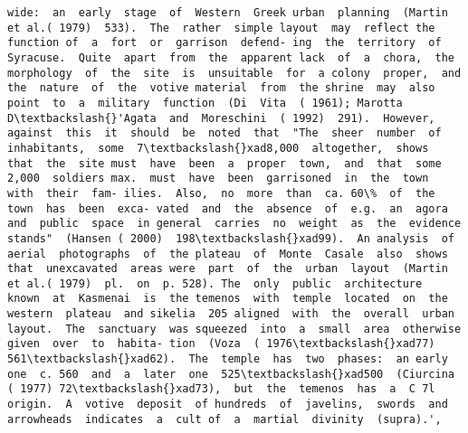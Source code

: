 \documentclass[11pt]{article}
\begin{document}
\begin{Verbatim}[commandchars=\\\{\}]
wide:  an  early  stage  of  Western  Greek urban  planning  (Martin  et al.( 1979)  533).  The  rather  simple layout  may  reflect the function of  a  fort  or  garrison  defend- ing  the  territory  of  Syracuse.  Quite  apart  from  the  apparent lack  of  a  chora,  the  morphology  of  the  site  is  unsuitable  for  a colony  proper,  and  the  nature  of  the  votive material  from  the shrine  may  also  point  to  a  military  function  (Di  Vita  ( 1961); Marotta  D\textbackslash{}'Agata  and  Moreschini  ( 1992)  291).  However, against  this  it  should  be  noted  that  "The  sheer  number  of inhabitants,  some  7\textbackslash{}xad8,000  altogether,  shows  that  the  site must  have  been  a  proper  town,  and  that  some  2,000  soldiers max.  must  have  been  garrisoned  in  the  town  with  their  fam- ilies.  Also,  no  more  than  ca. 60\%  of  the  town  has  been  exca- vated  and  the  absence  of  e.g.  an  agora  and  public  space  in general  carries  no  weight  as  the  evidence  stands"  (Hansen ( 2000)  198\textbackslash{}xad99).  An analysis  of  aerial  photographs  of  the plateau  of  Monte  Casale  also  shows  that  unexcavated  areas were  part  of  the  urban  layout  (Martin  et al.( 1979)  pl.  on  p. 528). The  only  public  architecture  known  at  Kasmenai  is  the temenos  with  temple  located  on  the  western  plateau  and sikelia  205 aligned  with  the  overall  urban  layout.  The  sanctuary  was squeezed  into  a  small  area  otherwise  given  over  to  habita- tion  (Voza  ( 1976\textbackslash{}xad77)  561\textbackslash{}xad62).  The  temple  has  two  phases:  an early  one  c. 560  and  a  later  one  525\textbackslash{}xad500  (Ciurcina  ( 1977) 72\textbackslash{}xad73),  but  the  temenos  has  a  C 7l  origin.  A  votive  deposit  of hundreds  of  javelins,  swords  and  arrowheads  indicates  a  cult of  a  martial  divinity  (supra).',

\end{Verbatim}
\end{document}

